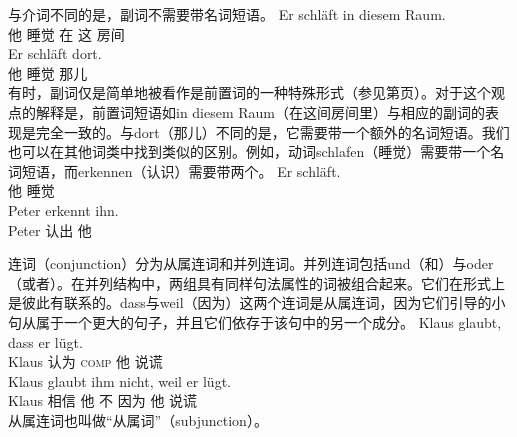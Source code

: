 与介词不同的是，副词不需要带名词短语。
\eal
\ex
\gll Er schläft in diesem Raum.\\
	 他 睡觉 在 这 房间\\
\ex
\gll Er schläft dort.\\
	 他 睡觉 那儿\\
\zl
有时，副词仅是简单地被看作是前置词的一种特殊形式（参见第\pageref{Seite-Adverbien-PP}页）。对于这个观点的解释是，前置词短语如in diesem Raum（在这间房间里）与相应的副词的表现是完全一致的。与dort（那儿）不同的是，它需要带一个额外的名词短语。我们也可以在其他词类中找到类似的区别。例如，动词schlafen（睡觉）需要带一个名词短语，而erkennen（认识）需要带两个。
\eal
\ex 
\gll Er schläft.\\
     他 睡觉\\
\ex 
\gll Peter erkennt ihn.\\
     Peter 认出 他\\
\zl

连词（conjunction）分为从属连词和并列连词。并列连词包括und（和）与oder（或者）。在并列结构中，两组具有同样句法属性的词被组合起来。它们在形式上是彼此有联系的。dass与weil（因为）这两个连词是从属连词，因为它们引导的小句从属于一个更大的句子，并且它们依存于该句中的另一个成分。
\eal
\ex 
\gll Klaus glaubt, dass er lügt.\\
	 Klaus 认为 \textsc{comp} 他 说谎\\
\ex 
\gll Klaus glaubt ihm nicht, weil er lügt.\\
	 Klaus 相信 他 不 因为 他 说谎\\
\zl
从属连词也叫做“从属词”（subjunction）。

